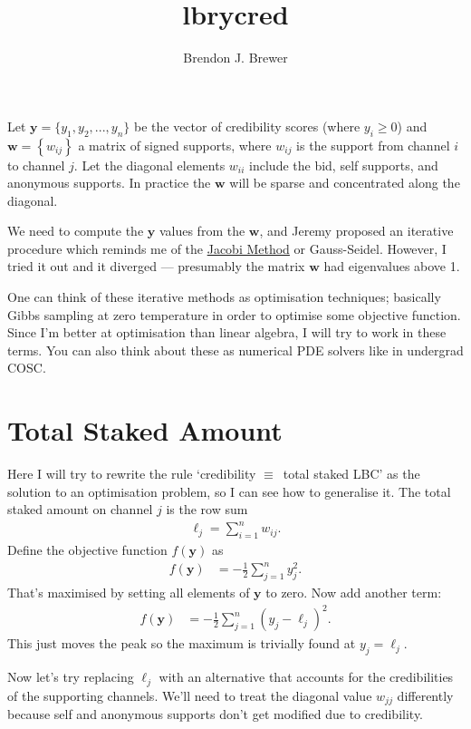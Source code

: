 \documentclass[a4paper, 12pt]{article}
\title{lbrycred}
\author{Brendon J. Brewer}
\date{}
\begin{document}
\maketitle


\setlength{\parindent}{0pt}
\setlength{\parskip}{8pt}

Let $\boldsymbol{y} = \{y_1, y_2, ..., y_n\}$ be the vector of credibility
scores (where $y_i \geq 0$) and $\boldsymbol{w} = \left\{w_{ij}\right\}$
a matrix of signed supports, where
$w_{ij}$ is the support from channel $i$ to channel $j$. Let the diagonal
elements $w_{ii}$ include the bid, self supports, and anonymous supports.
In practice the $\boldsymbol{w}$ will be sparse and concentrated along the
diagonal.

We need to compute the $\boldsymbol{y}$ values from the $\boldsymbol{w}$,
and Jeremy proposed an iterative procedure which reminds me of the
\href{https://en.wikipedia.org/wiki/Jacobi_method}{Jacobi Method} or
Gauss-Seidel. However,
I tried it out and it diverged --- presumably the matrix $\boldsymbol{w}$ had
eigenvalues above 1.

One can think of these iterative methods as optimisation techniques; basically
Gibbs sampling at zero temperature in order to optimise some objective
function. Since I'm better at optimisation than linear algebra, I will try to work in these terms. You can also think about these as numerical PDE solvers
like in undergrad COSC.

\section{Total Staked Amount}
Here I will try to rewrite the rule `credibility $\equiv$~total staked LBC'
as the solution to an optimisation problem, so I can see how to generalise it.
The total staked amount on channel $j$ is the row sum
\begin{align}
\ell_j = \sum_{i=1}^n w_{ij}.
\end{align}
Define the objective function $f(\boldsymbol{y})$ as
\begin{align}
f(\boldsymbol{y}) &= -\frac{1}{2}\sum_{j=1}^n y_j^2.
\end{align}
That's maximised by setting all elements of $\boldsymbol{y}$ to zero.
Now add another term:
\begin{align}
f(\boldsymbol{y}) &= -\frac{1}{2}\sum_{j=1}^n
                            \left(y_j - \ell_j\right)^2.
\end{align}
This just moves the peak so the maximum is trivially found at
$y_j = \ell_j$.

Now let's try replacing $\ell_j$ with an alternative that accounts for the
credibilities of the supporting channels. We'll need to treat the diagonal
value $w_{jj}$ differently because self and anonymous supports don't get
modified due to credibility.




\end{document}
